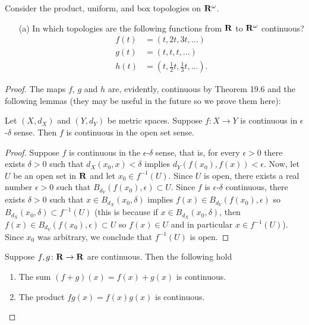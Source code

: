 \begin{problem}[Munkres \S20, Ex.\,4(a)]
Consider the product, uniform, and box topologies on
$\mathbf{R}^\omega$.
\begin{enumerate}[noitemsep]
\item[(a)] In which topologies are the following functions from
  $\mathbf{R}$ to $\mathbf{R}^\omega$ continuous?
  \begin{align*}
    f(t)&=(t,2t,3t,...)\\
    g(t)&=(t,t,t,...)\\
    h(t)&=\left(t,\tfrac{1}{2}t,\tfrac{1}{3}t,...\right).
  \end{align*}
\end{enumerate}
\end{problem}
\begin{proof}
The maps $f$, $g$ and $h$ are, evidently, continuous by Theorem
19.6 and the following lemmas (they may be useful in the future
so we prove them here):
\begin{lemma}[Munkres \S18, Ex.\,1]
Let $(X,d_X)$ and $(Y,d_Y)$ be metric spaces. Suppose $f\colon
X\to Y$ is continuous in $\epsilon$-$\delta$ sense. Then $f$ is
continuous in the open set sense.
\end{lemma}
\begin{proof}
\renewcommand\qedsymbol{$\clubsuit$}
Suppose $f$ is continuous in the $\epsilon$-$\delta$ sense, that
is, for every $\epsilon>0$ there exists $\delta>0$ such that
$d_X\left(x_0,x\right)<\delta$ implies
$d_Y\left(f(x_0),f(x)\right)<\epsilon$. Now, let $U$ be an open
set in $\mathbf{R}$ and let $x_0\in f^{-1}(U)$. Since $U$ is open, there
exists a real number $\epsilon>0$ such that
$B_{d_Y}\left(f(x_0),\epsilon\right)\subset U$. Since $f$ is
$\epsilon$-$\delta$ continuous, there exists $\delta>0$ such that
$x\in B_{d_X}\left(x_0,\delta\right)$ implies
$f(x)\in B_{d_Y}\left(f(x_0),\epsilon\right)$ so
$B_{d_X}\left(x_0,\delta\right)\subset f^{-1}(U)$ (this is
because if $x\in B_{d_X}\left(x_0,\delta\right)$, then $f(x)\in
B_{d_Y}\left(f(x_0),\epsilon\right)\subset U$ so $f(x)\in
U$ and in particular $x\in f^{-1}(U)$). Since $x_0$ was arbitrary,
we conclude that $f^{-1}(U)$ is open.
\end{proof}
\begin{lemma}
Suppose $f,g\colon\mathbf{R}\to\mathbf{R}$ are continuous. Then the following
hold
\begin{enumerate}[noitemsep,label=(\roman*)]
\item The sum $(f+g)(x)=f(x)+g(x)$ is continuous.
\item The product $fg(x)=f(x)g(x)$ is continuous.

\end{enumerate}
\end{lemma}
\end{proof}
